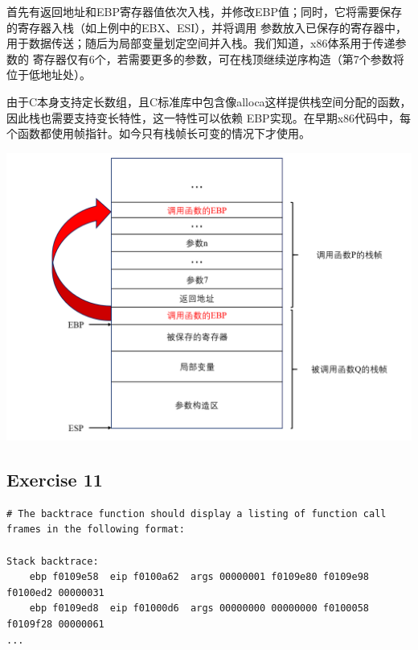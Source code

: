 \documentclass[12pt, letterpaper]{report}
\begin{document}
首先有返回地址和EBP寄存器值依次入栈，并修改EBP值；同时，它将需要保存的寄存器入栈（如上例中的EBX、ESI），并将调用
参数放入已保存的寄存器中，用于数据传送；随后为局部变量划定空间并入栈。我们知道，x86体系用于传递参数的
寄存器仅有6个，若需要更多的参数，可在栈顶继续逆序构造（第7个参数将位于低地址处）。 \par 
由于C本身支持定长数组，且C标准库中包含像alloca这样提供栈空间分配的函数，因此栈也需要支持变长特性，这一特性可以依赖
EBP实现。在早期x86代码中，每个函数都使用帧指针。如今只有栈帧长可变的情况下才使用。 \par 
\quad \par
\includegraphics[width=\textwidth]{StackFrame}

\newpage
\subsection{\large Exercise 11}

\lstset{style=AssemblyStyle}
\setmainfont{Consolas}
\begin{lstlisting}
# The backtrace function should display a listing of function call frames in the following format:

Stack backtrace:
    ebp f0109e58  eip f0100a62  args 00000001 f0109e80 f0109e98 f0100ed2 00000031
    ebp f0109ed8  eip f01000d6  args 00000000 00000000 f0100058 f0109f28 00000061
...
\end{lstlisting}
\setmainfont{Times New Roman}
\end{document}
